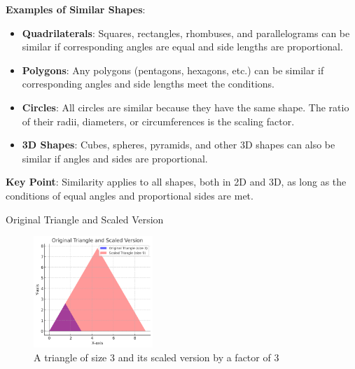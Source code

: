 \documentclass{beamer}
\begin{document}
\begin{frame}
    \vspace{10pt}
    \textbf{Examples of Similar Shapes}:
    \begin{itemize}
        \item \textbf{Quadrilaterals}: Squares, rectangles, rhombuses, and parallelograms can be similar if corresponding angles are equal and side lengths are proportional.
        \item \textbf{Polygons}: Any polygons (pentagons, hexagons, etc.) can be similar if corresponding angles and side lengths meet the conditions.
        \item \textbf{Circles}: All circles are similar because they have the same shape. The ratio of their radii, diameters, or circumferences is the scaling factor.
        \item \textbf{3D Shapes}: Cubes, spheres, pyramids, and other 3D shapes can also be similar if angles and sides are proportional.
    \end{itemize}

    \vspace{10pt}
    \textbf{Key Point}: Similarity applies to all shapes, both in 2D and 3D, as long as the conditions of equal angles and proportional sides are met.
\end{frame}

\begin{frame}{Original Triangle and Scaled Version}
    \begin{figure}
        \centering
        \includegraphics[width=0.4\textwidth]{similar_triangle.png} %
        \caption{A triangle of size 3 and its scaled version by a factor of 3}
    \end{figure}
\end{frame}
\end{document}
